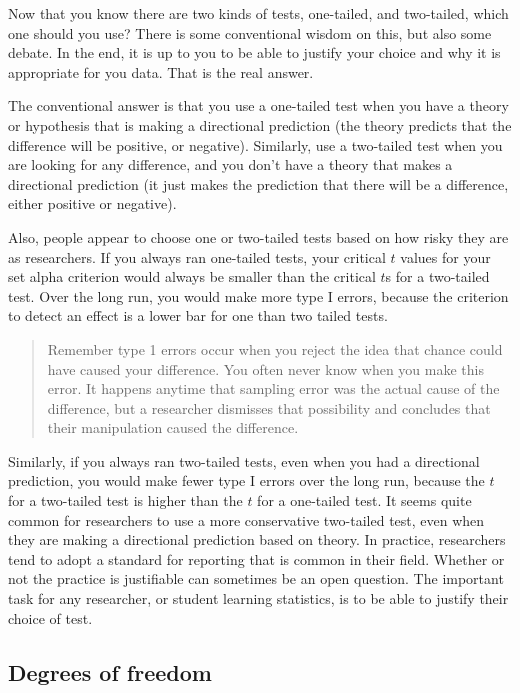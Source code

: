 \documentclass[]{book}
\begin{document}
Now that you know there are two kinds of tests, one-tailed, and two-tailed, which one should you use? There is some conventional wisdom on this, but also some debate. In the end, it is up to you to be able to justify your choice and why it is appropriate for you data. That is the real answer.

The conventional answer is that you use a one-tailed test when you have a theory or hypothesis that is making a directional prediction (the theory predicts that the difference will be positive, or negative). Similarly, use a two-tailed test when you are looking for any difference, and you don't have a theory that makes a directional prediction (it just makes the prediction that there will be a difference, either positive or negative).

Also, people appear to choose one or two-tailed tests based on how risky they are as researchers. If you always ran one-tailed tests, your critical \(t\) values for your set alpha criterion would always be smaller than the critical \(t\)s for a two-tailed test. Over the long run, you would make more type I errors, because the criterion to detect an effect is a lower bar for one than two tailed tests.

\begin{quote}
Remember type 1 errors occur when you reject the idea that chance could have caused your difference. You often never know when you make this error. It happens anytime that sampling error was the actual cause of the difference, but a researcher dismisses that possibility and concludes that their manipulation caused the difference.
\end{quote}

Similarly, if you always ran two-tailed tests, even when you had a directional prediction, you would make fewer type I errors over the long run, because the \(t\) for a two-tailed test is higher than the \(t\) for a one-tailed test. It seems quite common for researchers to use a more conservative two-tailed test, even when they are making a directional prediction based on theory. In practice, researchers tend to adopt a standard for reporting that is common in their field. Whether or not the practice is justifiable can sometimes be an open question. The important task for any researcher, or student learning statistics, is to be able to justify their choice of test.

\hypertarget{degrees-of-freedom}{%
\subsection{Degrees of freedom}\label{degrees-of-freedom}}
\end{document}
